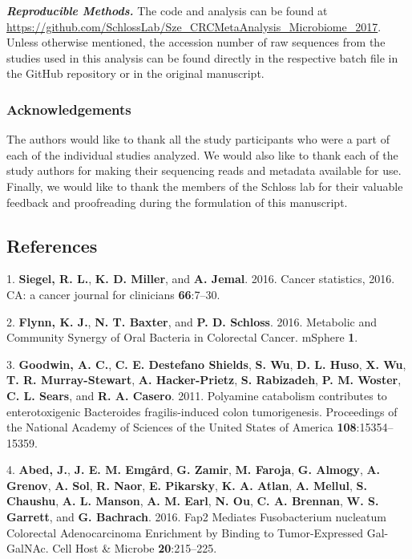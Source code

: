 \documentclass[12pt,]{article}
\begin{document}
\textbf{\emph{Reproducible Methods.}} The code and analysis can be found
at
\url{https://github.com/SchlossLab/Sze_CRCMetaAnalysis_Microbiome_2017}.
Unless otherwise mentioned, the accession number of raw sequences from
the studies used in this analysis can be found directly in the
respective batch file in the GitHub repository or in the original
manuscript.

\newpage

\subsubsection{Acknowledgements}\label{acknowledgements}

The authors would like to thank all the study participants who were a
part of each of the individual studies analyzed. We would also like to
thank each of the study authors for making their sequencing reads and
metadata available for use. Finally, we would like to thank the members
of the Schloss lab for their valuable feedback and proofreading during
the formulation of this manuscript.

\newpage

\subsection{References}\label{references}

\hypertarget{refs}{}
\hypertarget{ref-siegel_cancer_2016}{}
1. \textbf{Siegel, R. L.}, \textbf{K. D. Miller}, and \textbf{A. Jemal}.
2016. Cancer statistics, 2016. CA: a cancer journal for clinicians
\textbf{66}:7--30.

\hypertarget{ref-flynn_metabolic_2016}{}
2. \textbf{Flynn, K. J.}, \textbf{N. T. Baxter}, and \textbf{P. D.
Schloss}. 2016. Metabolic and Community Synergy of Oral Bacteria in
Colorectal Cancer. mSphere \textbf{1}.

\hypertarget{ref-goodwin_polyamine_2011}{}
3. \textbf{Goodwin, A. C.}, \textbf{C. E. Destefano Shields}, \textbf{S.
Wu}, \textbf{D. L. Huso}, \textbf{X. Wu}, \textbf{T. R. Murray-Stewart},
\textbf{A. Hacker-Prietz}, \textbf{S. Rabizadeh}, \textbf{P. M. Woster},
\textbf{C. L. Sears}, and \textbf{R. A. Casero}. 2011. Polyamine
catabolism contributes to enterotoxigenic Bacteroides fragilis-induced
colon tumorigenesis. Proceedings of the National Academy of Sciences of
the United States of America \textbf{108}:15354--15359.

\hypertarget{ref-abed_fap2_2016}{}
4. \textbf{Abed, J.}, \textbf{J. E. M. Emgård}, \textbf{G. Zamir},
\textbf{M. Faroja}, \textbf{G. Almogy}, \textbf{A. Grenov}, \textbf{A.
Sol}, \textbf{R. Naor}, \textbf{E. Pikarsky}, \textbf{K. A. Atlan},
\textbf{A. Mellul}, \textbf{S. Chaushu}, \textbf{A. L. Manson},
\textbf{A. M. Earl}, \textbf{N. Ou}, \textbf{C. A. Brennan}, \textbf{W.
S. Garrett}, and \textbf{G. Bachrach}. 2016. Fap2 Mediates Fusobacterium
nucleatum Colorectal Adenocarcinoma Enrichment by Binding to
Tumor-Expressed Gal-GalNAc. Cell Host \& Microbe \textbf{20}:215--225.
\end{document}
